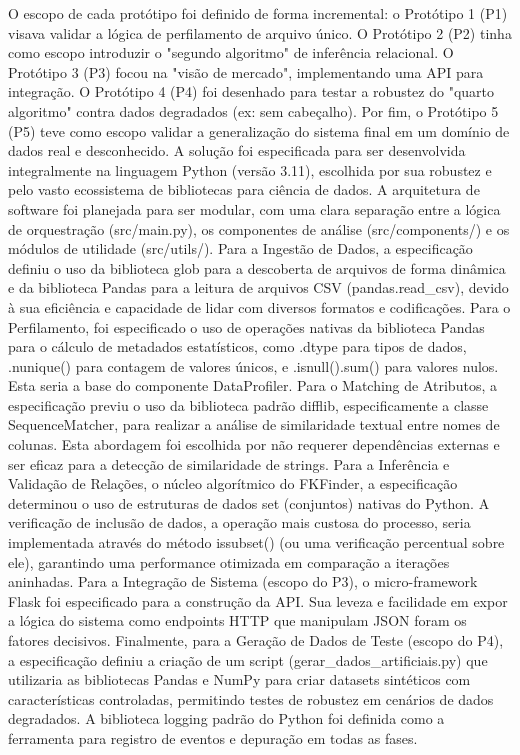 \documentclass[12pt, a4paper]{article}
\begin{document}
O escopo de cada protótipo foi definido de forma incremental: o Protótipo 1 (P1) visava validar a lógica de perfilamento de arquivo único. 
O Protótipo 2 (P2) tinha como escopo introduzir o "segundo algoritmo" de inferência relacional. 
O Protótipo 3 (P3) focou na "visão de mercado", implementando uma API para integração.
O Protótipo 4 (P4) foi desenhado para testar a robustez do "quarto algoritmo" contra dados degradados (ex: sem cabeçalho).
Por fim, o Protótipo 5 (P5) teve como escopo validar a generalização do sistema final em um domínio de dados real e desconhecido.
A solução foi especificada para ser desenvolvida integralmente na linguagem Python (versão 3.11), escolhida por sua robustez e pelo vasto ecossistema de bibliotecas para ciência de dados.
A arquitetura de software foi planejada para ser modular, com uma clara separação entre a lógica de orquestração (src/main.py), os componentes de análise (src/components/) e os módulos de utilidade (src/utils/).
Para a Ingestão de Dados, a especificação definiu o uso da biblioteca glob para a descoberta de arquivos de forma dinâmica e da biblioteca Pandas para a leitura de arquivos CSV (pandas.read\_csv), devido à sua eficiência e capacidade de lidar com diversos formatos e codificações.
Para o Perfilamento, foi especificado o uso de operações nativas da biblioteca Pandas para o cálculo de metadados estatísticos, como .dtype para tipos de dados, .nunique() para contagem de valores únicos, e .isnull().sum() para valores nulos.
Esta seria a base do componente DataProfiler.
Para o Matching de Atributos, a especificação previu o uso da biblioteca padrão difflib, especificamente a classe SequenceMatcher, para realizar a análise de similaridade textual entre nomes de colunas.
Esta abordagem foi escolhida por não requerer dependências externas e ser eficaz para a detecção de similaridade de strings.
Para a Inferência e Validação de Relações, o núcleo algorítmico do FKFinder, a especificação determinou o uso de estruturas de dados set (conjuntos) nativas do Python.
A verificação de inclusão de dados, a operação mais custosa do processo, seria implementada através do método issubset() (ou uma verificação percentual sobre ele), garantindo uma performance otimizada em comparação a iterações aninhadas.
Para a Integração de Sistema (escopo do P3), o micro-framework Flask foi especificado para a construção da API.
Sua leveza e facilidade em expor a lógica do sistema como endpoints HTTP que manipulam JSON foram os fatores decisivos.
Finalmente, para a Geração de Dados de Teste (escopo do P4), a especificação definiu a criação de um script (gerar\_dados\_artificiais.py) que utilizaria as bibliotecas Pandas e NumPy para criar datasets sintéticos com características controladas, permitindo testes de robustez em cenários de dados degradados.
A biblioteca logging padrão do Python foi definida como a ferramenta para registro de eventos e depuração em todas as fases.
\end{document}
